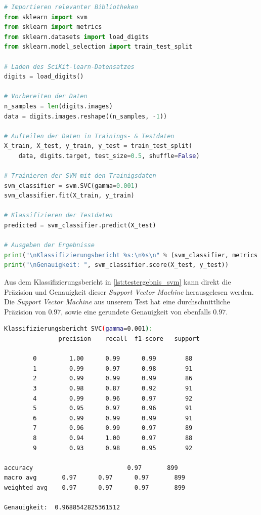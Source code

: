 \begin{minipage}{\textwidth}
	\begin{lstlisting}[language=Python, caption=Pythoncode zum Testen der SVM, label=lst:test_svm]
# Importieren relevanter Bibliotheken
from sklearn import svm
from sklearn import metrics
from sklearn.datasets import load_digits
from sklearn.model_selection import train_test_split

# Laden des SciKit-learn-Datensatzes
digits = load_digits()

# Vorbereiten der Daten
n_samples = len(digits.images)
data = digits.images.reshape((n_samples, -1))

# Aufteilen der Daten in Trainings- & Testdaten
X_train, X_test, y_train, y_test = train_test_split(
    data, digits.target, test_size=0.5, shuffle=False)

# Trainieren der SVM mit den Trainigsdaten
svm_classifier = svm.SVC(gamma=0.001)
svm_classifier.fit(X_train, y_train)

# Klassifizieren der Testdaten
predicted = svm_classifier.predict(X_test)

# Ausgeben der Ergebnisse
print("\nKlassifizierungsbericht %s:\n%s\n" % (svm_classifier, metrics.classification_report(y_test, predicted)))
print("\nGenauigkeit: ", svm_classifier.score(X_test, y_test))
	\end{lstlisting}
\end{minipage}

Aus dem Klassifizierungsbericht in \ref{lst:testergebnis_svm} kann direkt die Präzision und Genauigkeit dieser \textit{Support Vector Machine} 
herausgelesen werden. Die \textit{Support Vector Machine} aus unserem Test hat eine durchschnittliche Präzision von $0.97$, sowie eine 
gerundete Genauigkeit von ebenfalls $0.97$.

\begin{minipage}{\textwidth}
	\begin{lstlisting}[language=Bash, caption=Testergebnisse der SVM, label=lst:testergebnis_svm]
Klassifizierungsbericht SVC(gamma=0.001):
			   precision    recall  f1-score   support

		0         1.00      0.99      0.99        88
		1         0.99      0.97      0.98        91
		2         0.99      0.99      0.99        86
		3         0.98      0.87      0.92        91
		4         0.99      0.96      0.97        92
		5         0.95      0.97      0.96        91
		6         0.99      0.99      0.99        91
		7         0.96      0.99      0.97        89
		8         0.94      1.00      0.97        88
		9         0.93      0.98      0.95        92

accuracy                          0.97       899
macro avg    	0.97      0.97      0.97       899
weighted avg 	0.97      0.97      0.97       899

Genauigkeit:  0.9688542825361512
	\end{lstlisting}
\end{minipage}

